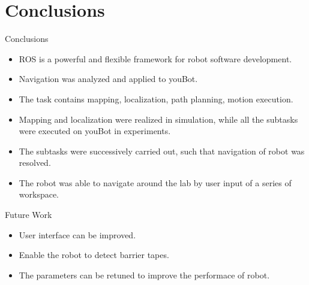 
\section{Conclusions}
\begin{frame}{Conclusions}
\begin{itemize}
	\item ROS is a powerful and flexible framework for robot software development.
	\item Navigation was analyzed and applied to youBot.    
	\item The task contains mapping, localization, path planning, motion execution.
	\item Mapping and localization were realized in simulation, while all the subtasks were executed on youBot in experiments.
	\item The subtasks were successively carried out, such that navigation of robot was resolved. 
	\item The robot was able to navigate around the lab by user input of a series of workspace.
\end{itemize}
\end{frame}
\begin{frame}{Future Work}
\begin{itemize}
	\item User interface can be improved.
	\item Enable the robot to detect barrier tapes.
	\item The parameters can be retuned to improve the performace of robot. 
\end{itemize}
\end{frame}